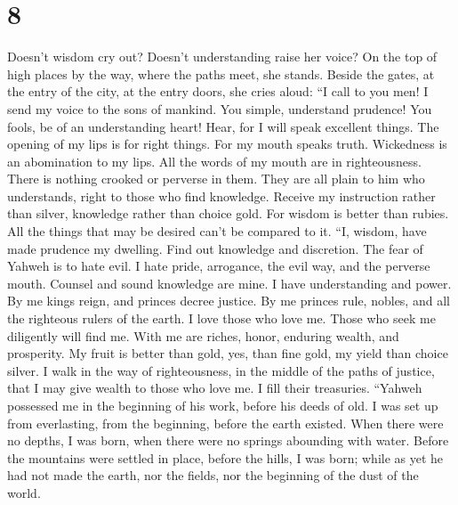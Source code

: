\hypertarget{section-7}{%
\section{8}\label{section-7}}

 Doesn't wisdom cry out? Doesn't understanding raise her
voice?  On the top of high places by the way, where the
paths meet, she stands.  Beside the gates, at the entry of
the city, at the entry doors, she cries aloud:  ``I call
to you men! I send my voice to the sons of mankind.  You
simple, understand prudence! You fools, be of an understanding heart!
 Hear, for I will speak excellent things. The opening of
my lips is for right things.  For my mouth speaks truth.
Wickedness is an abomination to my lips.  All the words of
my mouth are in righteousness. There is nothing crooked or perverse in
them.  They are all plain to him who understands, right to
those who find knowledge.  Receive my instruction rather
than silver, knowledge rather than choice gold.  For
wisdom is better than rubies. All the things that may be desired can't
be compared to it.  ``I, wisdom, have made prudence my
dwelling. Find out knowledge and discretion.  The fear of
Yahweh is to hate evil. I hate pride, arrogance, the evil way, and the
perverse mouth.  Counsel and sound knowledge are mine. I
have understanding and power.  By me kings reign, and
princes decree justice.  By me princes rule, nobles, and
all the righteous rulers of the earth.  I love those who
love me. Those who seek me diligently will find me.  With
me are riches, honor, enduring wealth, and prosperity. 
My fruit is better than gold, yes, than fine gold, my yield than choice
silver.  I walk in the way of righteousness, in the
middle of the paths of justice,  that I may give wealth
to those who love me. I fill their treasuries.  ``Yahweh
possessed me in the beginning of his work, before his deeds of old.
 I was set up from everlasting, from the beginning,
before the earth existed.  When there were no depths, I
was born, when there were no springs abounding with water.
 Before the mountains were settled in place, before the
hills, I was born;  while as yet he had not made the
earth, nor the fields, nor the beginning of the dust of the world.
